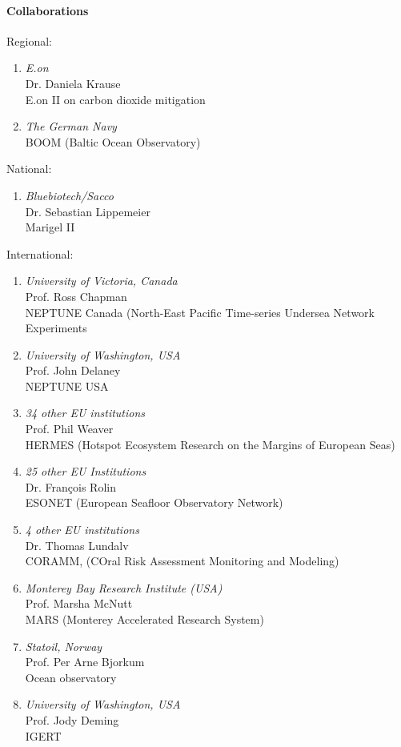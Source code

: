 \paragraph{Collaborations}
\noindent

Regional:
\begin{enumerate}
\item {\sl E.on} \\ Dr.
Daniela Krause \\ E.on II on carbon dioxide mitigation
\item {\sl The German
Navy} \\BOOM (Baltic Ocean Observatory)
\end{enumerate}

National:
\begin{enumerate}
\item {\sl
Bluebiotech/Sacco} \\ Dr. Sebastian Lippemeier\\ Marigel II
\end{enumerate}

International:
\begin{enumerate}
\item {\sl University of Victoria, Canada} \\ Prof. Ross Chapman \\
NEPTUNE Canada (North-East Pacific Time-series Undersea Network Experiments
 \item {\sl University of Washington, USA} \\ Prof. John Delaney \\
NEPTUNE USA
\item {\sl 34 other EU institutions} \\ Prof. Phil Weaver \\
HERMES (Hotspot Ecosystem Research on the Margins of European
Seas) \item {\sl 25 other EU Institutions} \\ Dr. Fran\c{c}ois
Rolin \\ ESONET (European Seafloor Observatory Network) \item
{\sl4 other EU institutions} \\ Dr. Thomas Lundalv \\ CORAMM,
(COral Risk Assessment Monitoring and Modeling) \item {\sl
Monterey Bay Research Institute (USA)} \\ Prof. Marsha McNutt \\
MARS (Monterey Accelerated Research System)   \item
{\sl Statoil, Norway} \\ Prof. Per Arne Bjorkum \\ Ocean
observatory \item {\sl University of Washington, USA} \\ Prof.
Jody Deming  \\ IGERT
\end{enumerate}


